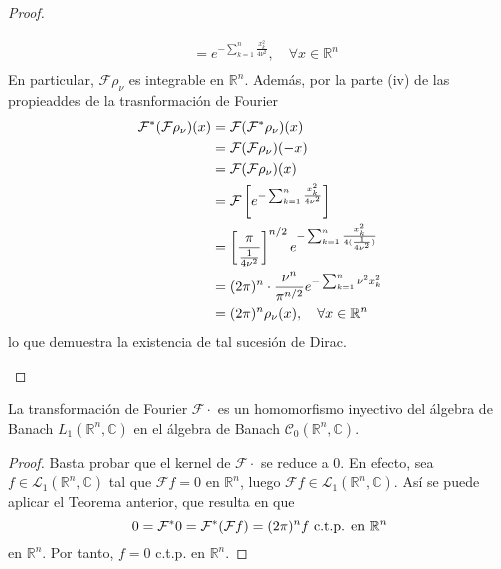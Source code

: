\documentclass[12pt]{report}
\theoremstyle{largebreak}
\newcommand{\fou}[1]{\ensuremath{\mathcal{F}#1}}
\begin{document}
\begin{proof}
\begin{enumerate}
\begin{equation*}
\begin{split}
                    &=e^{ -\sum_{ k=1}^n \frac{x_k^2}{4\nu^2}},\quad\forall x\in\mathbb{R}^n \\
                \end{split}
            \end{equation*}
            En particular, $\fou{\rho_\nu}$ es integrable en $\mathbb{R}^n$. Además, por la parte (iv) de las propieaddes de la trasnformación de Fourier
            \begin{equation*}
                \begin{split}
                    \fou^*{(\fou{\rho_\nu})}(x)&=\fou{(\fou^*{\rho_\nu})}(x)\\
                    &=\fou{(\fou{\rho_\nu})}(-x)\\
                    &=\fou{(\fou{\rho_\nu})}(x)\\
                    &=\fou{\left[e^{ -\sum_{ k=1}^n \frac{x_k^2}{4\nu^2}} \right]}\\
                    &=\left[\frac{\pi}{\frac{1}{4\nu^2}}\right]^{ n/2}e^{-\sum_{ k=1}^n \frac{x_k^2}{4(\frac{1}{4\nu^2})}}\\
                    &=(2\pi)^n\cdot\frac{\nu^n}{\pi^{n/2}}e^{ -\sum_{ k=1}^n \nu^2 x_k^2}\\
                    &=(2\pi)^n\rho_\nu(x),\quad\forall x\in\mathbb{R}^n\\
                \end{split}
            \end{equation*}
            lo que demuestra la existencia de tal sucesión de Dirac.
        \end{enumerate}
    \end{proof}

    \begin{propo}
        La transformación de Fourier $\fou{\cdot}$ es un homomorfismo inyectivo del álgebra de Banach $L_1(\mathbb{R}^n,\mathbb{C})$ en el álgebra de Banach $\mathcal{C}_0(\mathbb{R}^n,\mathbb{C})$.
    \end{propo}

    \begin{proof}
        Basta probar que el kernel de $\fou{\cdot}$ se reduce a $0$. En efecto, sea $f\in\mathcal{L}_1(\mathbb{R}^n,\mathbb{C})$ tal que $\fou{f}=0$ en $\mathbb{R}^n$, luego $\fou{f}\in\mathcal{L}_1(\mathbb{R}^n,\mathbb{C})$. Así se puede aplicar el Teorema anterior, que resulta en que
        \begin{equation*}
            0=\fou^*{0}=\fou^*{(\fou{f})}=(2\pi)^nf\textup{ c.t.p. en }\mathbb{R}^n
        \end{equation*}
        en $\mathbb{R}^n$. Por tanto, $f=0$ c.t.p. en $\mathbb{R}^n$.
    \end{proof}
\end{document}
